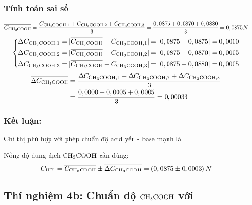     \subsubsection{Tính toán sai số}
        \begin{equation}
            \overline{C_{\ce{CH3COOH}}} = \frac{C_{\ce{CH3COOH}, 1} + C_{\ce{CH3COOH}, 2} + C_{\ce{CH3COOH}, 3}}{3} = \frac{0,0875 + 0,0870 + 0,0880}{3} = 0,0875N
        \end{equation}
        \begin{equation}
            \left\{
            \begin{aligned}
                \Delta C_{\ce{CH3COOH}, 1} = |\overline{C_{\ce{CH3COOH}}} - C_{\ce{CH3COOH}, 1}| = |0,0875 - 0,0875| = 0,0000 \\
                \Delta C_{\ce{CH3COOH}, 2} = |\overline{C_{\ce{CH3COOH}}} - C_{\ce{CH3COOH}, 2}| = |0,0875 - 0,0870| = 0,0005 \\
                \Delta C_{\ce{CH3COOH}, 3} = |\overline{C_{\ce{CH3COOH}}} - C_{\ce{CH3COOH}, 3}| = |0,0875 - 0,0880| = 0,0005
            \end{aligned}
            \right.
        \end{equation}
        \begin{equation}
            \begin{aligned}
                \overline{\Delta C_{\ce{CH3COOH}}}
                &= \frac{\Delta C_{\ce{CH3COOH}, 1} + \Delta C_{\ce{CH3COOH}, 2} + \Delta C_{\ce{CH3COOH}, 3}}{3} \\
                &= \frac{0,0000 + 0,0005 + 0,0005}{3} = 0,00033
            \end{aligned}
        \end{equation}
    \subsubsection{Kết luận:}
    \begin{center}
        Chỉ thị phù hợp với phép chuẩn độ acid yếu - base mạnh là \textbf{\PhenolphthaleinWord}
    \end{center}
    Nồng độ dung dịch \(\ce{CH3COOH}\) cần dùng:
    \begin{equation}
        C_{\ce{HCl}} = \overline{C_{\ce{CH3COOH}}} \pm \overline{\Delta C_{\ce{CH3COOH}}} = (0,0875 \pm 0,0003)\,N
    \end{equation}

\subsection{Thí nghiệm 4b: Chuẩn độ \(\ce{CH3COOH}\) với \MethylOrangeWord}
